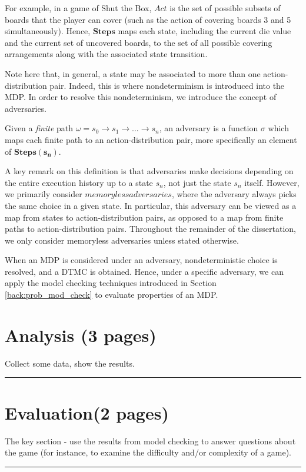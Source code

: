 For example, in a game of Shut the Box, $Act$ is the set of possible subsets of boards that the player can cover (such as the action of covering boards 3 and 5 simultaneously). Hence, $\mathbf{Steps}$ maps each state, including the current die value and the current set of uncovered boards, to the set of all possible covering arrangements along with the associated state transition.

Note here that, in general, a state may be associated to more than one action-distribution pair. Indeed, this is where nondeterminism is introduced into the MDP. In order to resolve this nondeterminism, we introduce the concept of adversaries.

\begin{definition}
\label{cs1:adversaries}

Given a \emph{finite} path $\omega = s_0 \rightarrow s_1 \rightarrow \dots \rightarrow s_n$, an adversary is a function $\sigma$ which maps each finite path to an action-distribution pair, more specifically an element of $\mathbf{Steps(s_n)}$.

\end{definition}

A key remark on this definition is that adversaries make decisions depending on the entire execution history up to a state $s_n$, not just the state $s_n$ itself. However, we primarily consider $memoryless adversaries$, where the adversary always picks the same choice in a given state. In particular, this adversary can be viewed as a map from states to action-distribution pairs, as opposed to a map from finite paths to action-distribution pairs. Throughout the remainder of the dissertation, we only consider memoryless adversaries unless stated otherwise.

When an MDP is considered under an adversary, nondeterministic choice is resolved, and a DTMC is obtained. Hence, under a specific adversary, we can apply the model checking techniques introduced in Section \ref{back:prob_mod_check} to evaluate properties of an MDP.

\section{Analysis (3 pages)}

Collect some data, show the results.

\hrule

\Blindtext

\Blindtext

\Blindtext

\section{Evaluation(2 pages)}

The key section - use the results from model checking to answer questions about the game (for instance, to examine the difficulty and/or complexity of a game).

\hrule

\Blindtext

\Blindtext